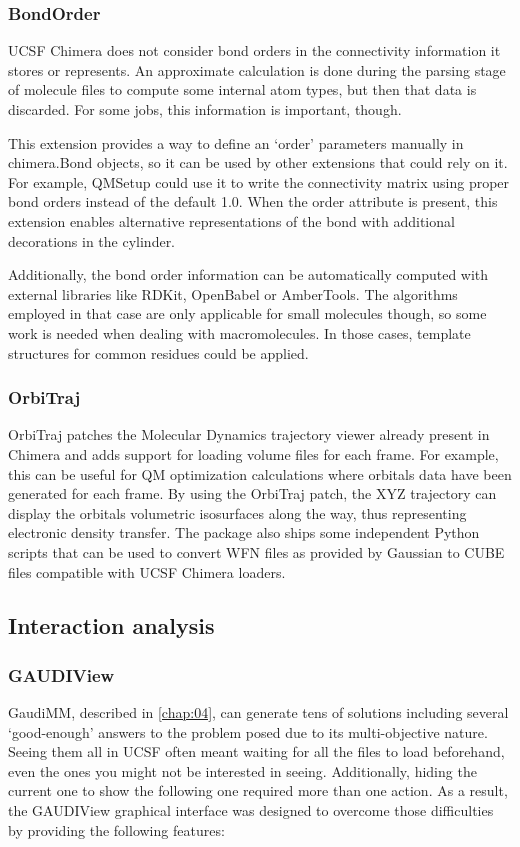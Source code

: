 \subsubsection{BondOrder}
UCSF Chimera does not consider bond orders in the connectivity information it stores or represents. An approximate calculation is done during the parsing stage of molecule files to compute some internal atom types, but then that data is discarded. For some jobs, this information is important, though.

This extension provides a way to define an ‘order’ parameters manually in chimera.Bond objects, so it can be used by other extensions that could rely on it. For example, QMSetup could use it to write the connectivity matrix using proper bond orders instead of the default 1.0. When the order attribute is present, this extension enables alternative representations of the bond with additional decorations in the cylinder.

Additionally, the bond order information can be automatically computed with external libraries like RDKit, OpenBabel or AmberTools. The algorithms employed in that case are only applicable for small molecules though, so some work is needed when dealing with macromolecules. In those cases, template structures for common residues could be applied.

\subsubsection{OrbiTraj}
OrbiTraj patches the Molecular Dynamics trajectory viewer already present in Chimera and adds support for loading volume files for each frame. For example, this can be useful for QM optimization calculations where orbitals data have been generated for each frame. By using the OrbiTraj patch, the XYZ trajectory can display the orbitals volumetric isosurfaces along the way, thus representing electronic density transfer. The package also ships some independent Python scripts that can be used to convert WFN files as provided by Gaussian to CUBE files compatible with UCSF Chimera loaders.

\subsection{Interaction analysis}
\subsubsection{GAUDIView}
GaudiMM, described in \autoref{chap:04}, can generate tens of solutions including several ‘good-enough’ answers to the problem posed due to its multi-objective nature. Seeing them all in UCSF often meant waiting for all the files to load beforehand, even the ones you might not be interested in seeing. Additionally, hiding the current one to show the following one required more than one action. As a result, the GAUDIView graphical interface was designed to overcome those difficulties by providing the following features:

